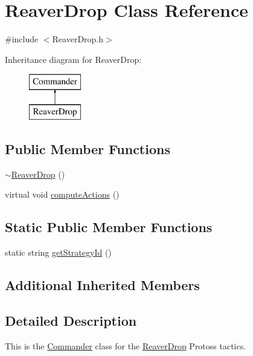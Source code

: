 \hypertarget{class_reaver_drop}{\section{Reaver\-Drop Class Reference}
\label{class_reaver_drop}
}


{\ttfamily \#include $<$Reaver\-Drop.\-h$>$}

Inheritance diagram for Reaver\-Drop\-:\begin{figure}[H]
\begin{center}
\leavevmode
\includegraphics[height=2.000000cm]{class_reaver_drop}
\end{center}
\end{figure}
\subsection*{Public Member Functions}
\begin{DoxyCompactItemize}
\item 
\hyperlink{class_reaver_drop_a78488dc7f8c2ecbeca7cd77ec0b63f10}{$\sim$\-Reaver\-Drop} ()
\item 
virtual void \hyperlink{class_reaver_drop_afa8af5853c82a1f5115283cb0fddfbcd}{compute\-Actions} ()
\end{DoxyCompactItemize}
\subsection*{Static Public Member Functions}
\begin{DoxyCompactItemize}
\item 
static string \hyperlink{class_reaver_drop_a2c15a4ca003761f8dad293175705549e}{get\-Strategy\-Id} ()
\end{DoxyCompactItemize}
\subsection*{Additional Inherited Members}


\subsection{Detailed Description}
This is the \hyperlink{class_commander}{Commander} class for the \hyperlink{class_reaver_drop}{Reaver\-Drop} Protoss tactics.

